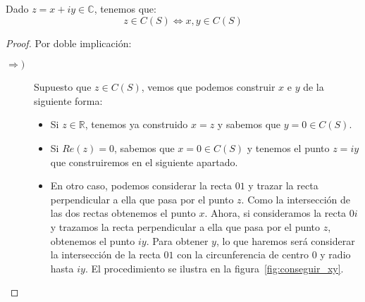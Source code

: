 \begin{lema}\label{lema:real_im}
    Dado $z=x+iy\in \mathbb{C}$, tenemos que:
    \begin{equation*}
        z\in C(S) \Longleftrightarrow x,y\in C(S)
    \end{equation*}
    \begin{proof}
        Por doble implicación:
        \begin{description}
            \item [$\Longrightarrow )$] Supuesto que $z\in C(S)$, vemos que podemos construir $x$ e $y$ de la siguiente forma:
                \begin{itemize}
                    \item Si $z\in \mathbb{R}$, tenemos ya construido $x=z$ y sabemos que $y=0\in C(S)$.
                    \item Si $Re(z) = 0$, sabemos que $x=0\in C(S)$ y tenemos el punto $z=iy$ que construiremos en el siguiente apartado.
                    \item En otro caso, podemos considerar la recta $01$ y trazar la recta perpendicular a ella que pasa por el punto $z$. Como la intersección de las dos rectas obtenemos el punto $x$. Ahora, si consideramos la recta $0i$ y trazamos la recta perpendicular a ella que pasa por el punto $z$, obtenemos el punto $iy$. Para obtener $y$, lo que haremos será considerar la intersección de la recta $01$ con la circunferencia de centro $0$ y radio hasta $iy$. El procedimiento se ilustra en la figura~\ref{fig:conseguir_xy}.
                        \begin{figure}
                            \centering
\end{figure}
\end{itemize}
\end{description}
\end{proof}
\end{lema}

